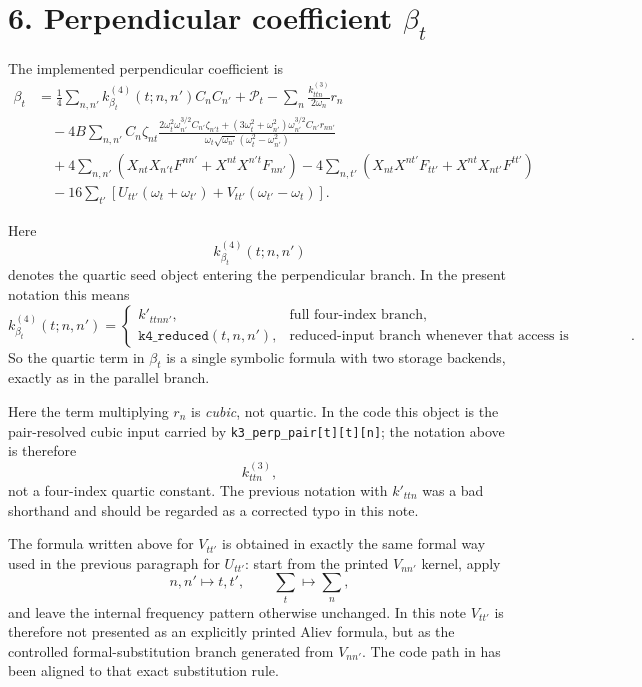 \documentclass[11pt]{article}
\begin{document}
\section*{6. Perpendicular coefficient \texorpdfstring{$\beta_t$}{beta t}}

The implemented perpendicular coefficient is
\begin{equation}
\begin{aligned}
\beta_t &=
\frac{1}{4}\sum_{n,n'} k^{(4)}_{\beta_t}(t;n,n') C_n C_{n'}
+ \mathcal{P}_t
- \sum_n \frac{k^{(3)}_{ttn}}{2\omega_n} r_n
\\[0.4em]
&\quad
- 4B\sum_{n,n'} C_n \zeta_{nt}
\frac{
2\omega_t^2 \omega_{n'}^{3/2} C_{n'}\zeta_{n't}
+
(3\omega_t^2+\omega_{n'}^2)\omega_{n'}^{3/2} C_{n'} r_{nn'}
}
{\omega_t\sqrt{\omega_{n'}}(\omega_t^2-\omega_{n'}^2)}
\\[0.4em]
&\quad
+ 4\sum_{n,n'}\left(X_{nt}X_{n't}F^{nn'} + X^{nt}X^{n't}F_{nn'}\right)
- 4\sum_{n,t'}\left(X_{nt}X^{nt'}F_{tt'} + X^{nt}X_{nt'}F^{tt'}\right)
\\[0.4em]
&\quad
- 16\sum_{t'} \left[U_{tt'}(\omega_t+\omega_{t'}) + V_{tt'}(\omega_{t'}-\omega_t)\right].
\end{aligned}
\end{equation}

Here
\[
k^{(4)}_{\beta_t}(t;n,n')
\]
denotes the quartic seed object entering the perpendicular branch. In the
present notation this means
\[
k^{(4)}_{\beta_t}(t;n,n')=
\begin{cases}
k'_{ttnn'}, & \text{full four-index branch},\\[0.4em]
\texttt{k4\_reduced}(t,n,n'), & \text{reduced-input branch whenever that access is represented}.
\end{cases}
\]
So the quartic term in $\beta_t$ is a single symbolic formula with two storage
backends, exactly as in the parallel branch.

Here the term multiplying $r_n$ is \emph{cubic}, not quartic. In the code this
object is the pair-resolved cubic input carried by
\texttt{k3\_perp\_pair[t][t][n]}; the notation above is therefore
\[
k^{(3)}_{ttn},
\]
not a four-index quartic constant. The previous notation with $k'_{ttn}$ was a
bad shorthand and should be regarded as a corrected typo in this note.

The formula written above for $V_{tt'}$ is obtained in exactly the same formal
way used in the previous paragraph for $U_{tt'}$: start from the printed
$V_{nn'}$ kernel, apply
\[
n,n' \mapsto t,t',
\qquad
\sum_t \mapsto \sum_n,
\]
and leave the internal frequency pattern otherwise unchanged. In this note
$V_{tt'}$ is therefore not presented as an explicitly printed Aliev formula, but
as the controlled formal-substitution branch generated from $V_{nn'}$. The code
path in  has
been aligned to that exact substitution rule.
\end{document}
